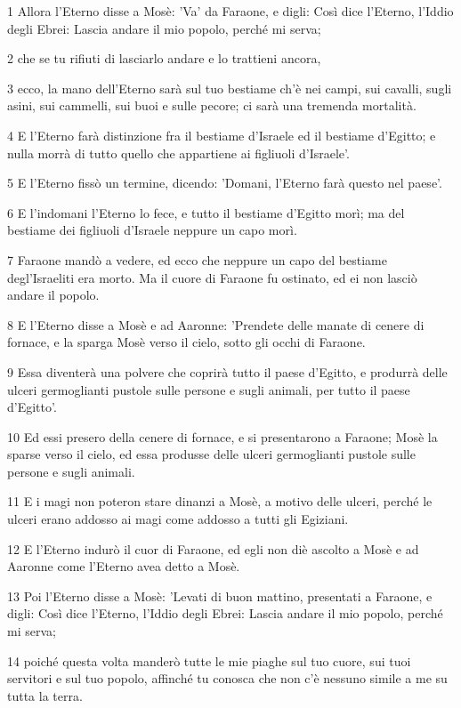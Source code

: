\par 1 Allora l'Eterno disse a Mosè: 'Va' da Faraone, e digli: Così dice l'Eterno, l'Iddio degli Ebrei: Lascia andare il mio popolo, perché mi serva;
\par 2 che se tu rifiuti di lasciarlo andare e lo trattieni ancora,
\par 3 ecco, la mano dell'Eterno sarà sul tuo bestiame ch'è nei campi, sui cavalli, sugli asini, sui cammelli, sui buoi e sulle pecore; ci sarà una tremenda mortalità.
\par 4 E l'Eterno farà distinzione fra il bestiame d'Israele ed il bestiame d'Egitto; e nulla morrà di tutto quello che appartiene ai figliuoli d'Israele'.
\par 5 E l'Eterno fissò un termine, dicendo: 'Domani, l'Eterno farà questo nel paese'.
\par 6 E l'indomani l'Eterno lo fece, e tutto il bestiame d'Egitto morì; ma del bestiame dei figliuoli d'Israele neppure un capo morì.
\par 7 Faraone mandò a vedere, ed ecco che neppure un capo del bestiame degl'Israeliti era morto. Ma il cuore di Faraone fu ostinato, ed ei non lasciò andare il popolo.
\par 8 E l'Eterno disse a Mosè e ad Aaronne: 'Prendete delle manate di cenere di fornace, e la sparga Mosè verso il cielo, sotto gli occhi di Faraone.
\par 9 Essa diventerà una polvere che coprirà tutto il paese d'Egitto, e produrrà delle ulceri germoglianti pustole sulle persone e sugli animali, per tutto il paese d'Egitto'.
\par 10 Ed essi presero della cenere di fornace, e si presentarono a Faraone; Mosè la sparse verso il cielo, ed essa produsse delle ulceri germoglianti pustole sulle persone e sugli animali.
\par 11 E i magi non poteron stare dinanzi a Mosè, a motivo delle ulceri, perché le ulceri erano addosso ai magi come addosso a tutti gli Egiziani.
\par 12 E l'Eterno indurò il cuor di Faraone, ed egli non diè ascolto a Mosè e ad Aaronne come l'Eterno avea detto a Mosè.
\par 13 Poi l'Eterno disse a Mosè: 'Levati di buon mattino, presentati a Faraone, e digli: Così dice l'Eterno, l'Iddio degli Ebrei: Lascia andare il mio popolo, perché mi serva;
\par 14 poiché questa volta manderò tutte le mie piaghe sul tuo cuore, sui tuoi servitori e sul tuo popolo, affinché tu conosca che non c'è nessuno simile a me su tutta la terra.
